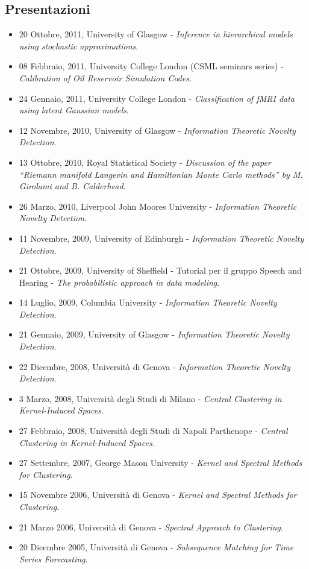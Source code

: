 \documentclass[a4paper,10pt]{article}
\begin{document}
\subsection*{Presentazioni}
\begin{itemize}
\item 20 Ottobre, 2011, University of Glasgow - \emph{Inference in hierarchical models using stochastic approximations}.
\item 08 Febbraio, 2011, University College London (CSML seminars series) - \emph{Calibration of Oil Reservoir Simulation Codes}.
\item 24 Gennaio, 2011, University College London - \emph{Classification of fMRI data using latent Gaussian models}.
\item 12 Novembre, 2010, University of Glasgow - \emph{Information Theoretic Novelty Detection}.
\item 13 Ottobre, 2010, Royal Statistical Society - \emph{Discussion of the paper ``Riemann manifold Langevin and Hamiltonian Monte Carlo methods'' by M. Girolami and B. Calderhead}.
\item 26 Marzo, 2010, Liverpool John Moores University - \emph{Information Theoretic Novelty Detection}.
\item 11 Novembre, 2009, University of Edinburgh - \emph{Information Theoretic Novelty Detection}.
\item 21 Ottobre, 2009, University of Sheffield - Tutorial per il gruppo Speech and Hearing - \emph{The probabilistic approach in data modeling}.
\item 14 Luglio, 2009, Columbia University - \emph{Information Theoretic Novelty Detection}.
\item 21 Gennaio, 2009, University of Glasgow - \emph{Information Theoretic Novelty Detection}.
\item 22 Dicembre, 2008, Universit\`a di Genova - \emph{Information Theoretic Novelty Detection}.
\item 3 Marzo, 2008, Universit\`a degli Studi di Milano - \emph{Central Clustering in Kernel-Induced Spaces}.
\item 27 Febbraio, 2008, Universit\`a degli Studi di Napoli Parthenope - \emph{Central Clustering in Kernel-Induced Spaces}.
\item 27 Settembre, 2007, George Mason University - \emph{Kernel and Spectral Methods for Clustering}.
\item 15 Novembre 2006, Universit\`a di Genova - \emph{Kernel and Spectral Methods for Clustering}.
\item 21 Marzo 2006, Universit\`a di Genova - \emph{Spectral Approach to Clustering}.
\item 20 Dicembre 2005, Universit\`a di Genova - \emph{Subsequence Matching for Time Series Forecasting}.
\end{itemize}
\end{document}
